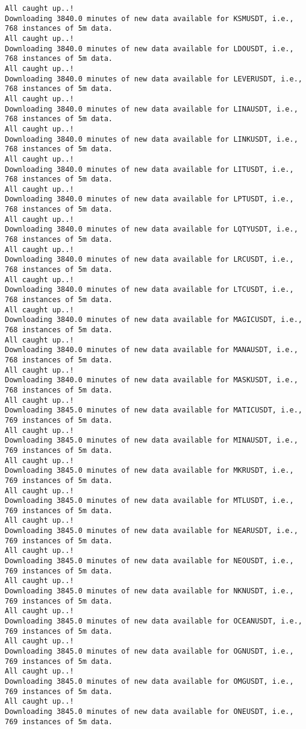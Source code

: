 \documentclass[
  letterpaper,
  DIV=11,
  numbers=noendperiod]{scrartcl}
\begin{document}
\begin{verbatim}
All caught up..!
Downloading 3840.0 minutes of new data available for KSMUSDT, i.e., 768 instances of 5m data.
All caught up..!
Downloading 3840.0 minutes of new data available for LDOUSDT, i.e., 768 instances of 5m data.
All caught up..!
Downloading 3840.0 minutes of new data available for LEVERUSDT, i.e., 768 instances of 5m data.
All caught up..!
Downloading 3840.0 minutes of new data available for LINAUSDT, i.e., 768 instances of 5m data.
All caught up..!
Downloading 3840.0 minutes of new data available for LINKUSDT, i.e., 768 instances of 5m data.
All caught up..!
Downloading 3840.0 minutes of new data available for LITUSDT, i.e., 768 instances of 5m data.
All caught up..!
Downloading 3840.0 minutes of new data available for LPTUSDT, i.e., 768 instances of 5m data.
All caught up..!
Downloading 3840.0 minutes of new data available for LQTYUSDT, i.e., 768 instances of 5m data.
All caught up..!
Downloading 3840.0 minutes of new data available for LRCUSDT, i.e., 768 instances of 5m data.
All caught up..!
Downloading 3840.0 minutes of new data available for LTCUSDT, i.e., 768 instances of 5m data.
All caught up..!
Downloading 3840.0 minutes of new data available for MAGICUSDT, i.e., 768 instances of 5m data.
All caught up..!
Downloading 3840.0 minutes of new data available for MANAUSDT, i.e., 768 instances of 5m data.
All caught up..!
Downloading 3840.0 minutes of new data available for MASKUSDT, i.e., 768 instances of 5m data.
All caught up..!
Downloading 3845.0 minutes of new data available for MATICUSDT, i.e., 769 instances of 5m data.
All caught up..!
Downloading 3845.0 minutes of new data available for MINAUSDT, i.e., 769 instances of 5m data.
All caught up..!
Downloading 3845.0 minutes of new data available for MKRUSDT, i.e., 769 instances of 5m data.
All caught up..!
Downloading 3845.0 minutes of new data available for MTLUSDT, i.e., 769 instances of 5m data.
All caught up..!
Downloading 3845.0 minutes of new data available for NEARUSDT, i.e., 769 instances of 5m data.
All caught up..!
Downloading 3845.0 minutes of new data available for NEOUSDT, i.e., 769 instances of 5m data.
All caught up..!
Downloading 3845.0 minutes of new data available for NKNUSDT, i.e., 769 instances of 5m data.
All caught up..!
Downloading 3845.0 minutes of new data available for OCEANUSDT, i.e., 769 instances of 5m data.
All caught up..!
Downloading 3845.0 minutes of new data available for OGNUSDT, i.e., 769 instances of 5m data.
All caught up..!
Downloading 3845.0 minutes of new data available for OMGUSDT, i.e., 769 instances of 5m data.
All caught up..!
Downloading 3845.0 minutes of new data available for ONEUSDT, i.e., 769 instances of 5m data.

\end{verbatim}
\end{document}
